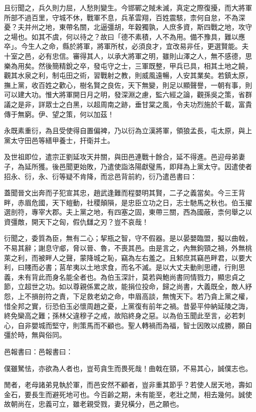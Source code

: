 \begin{pinyinscope}
且衍聞之，兵久則力屈，人愁則變生。今邯鄲之賊未滅，真定之際復擾，而大將軍所部不過百里，守城不休，戰軍不息，兵革雲翔，百姓震駭，柰何自怠，不為深憂？夫并州之地，東帶名關，北逼彊胡，年穀獨孰，人庶多資，斯四戰之地，攻守之場也。如其不虞，何以待之？故曰「德不素積，人不為用。備不豫具，難以應卒」。今生人之命，縣於將軍，將軍所杖，必須良才，宜改易非任，更選賢能。夫十室之邑，必有忠信。審得其人，以承大將軍之明，雖則山澤之人，無不感德，思樂為用矣。然後簡精銳之卒，發屯守之士，三軍既整，甲兵已具，相其土地之饒，觀其水泉之利，制屯田之術，習戰射之教，則威風遠暢，人安其業矣。若鎮太原，撫上黨，收百姓之歡心，樹名賢之良佐，天下無變，則足以顯聲譽，一朝有事，則可以建大功。惟大將軍開日月之明，發深淵之慮，監六經之論，觀孫吳之策，省群議之是非，詳眾士之白黑，以超周南之跡，垂甘棠之風，令夫功烈施於千載，富貴傳于無窮。伊、望之策，何以加茲！

永既素重衍，為且受使得自置偏裨，乃以衍為立漢將軍，領狼孟長，屯太原，與上黨太守田邑等繕甲養士，扞衛并土。

及世祖即位，遣宗正劉延攻天井關，與田邑連戰十餘合，延不得進。邑迎母弟妻子，為延所獲。後邑聞更始敗，乃遣使詣洛陽獻璧馬，即拜為上黨太守。因遣使者招永、衍，永、衍等疑不肯降，而忿邑背前約，衍乃遣邑書曰：

蓋聞晉文出奔而子犯宣其忠，趙武逢難而程嬰明其賢，二子之義當矣。今三王背畔，赤眉危國，天下螘動，社稷顛隕，是忠臣立功之日，志士馳馬之秋也。伯玉擢選剖符，專宰大郡。夫上黨之地，有四塞之固，東帶三關，西為國蔽，柰何舉之以資彊敵，開天下之匈，假仇讎之刃？豈不哀哉！

衍聞之，委質為臣，無有二心；挈瓶之智，守不假器。是以晏嬰臨盟，擬以曲戟，不易其辭；謝息守郕，脅以晉、魯，不喪其邑。由是言之，內無鉤頸之禍，外無桃萊之利，而被畔人之聲，蒙降城之恥，竊為左右羞之。且邾庶其竊邑畔君，以要大利，曰賤而必書；莒牟夷以土地求食，而名不滅。是以大丈夫動則思禮，行則思義，未有背此而身名能全者也。為伯玉深計，莫若與鮑尚書同情戮力，顯忠貞之節，立超世之功。如以尊親係累之故，能捐位投命，歸之尚書，大義既全，敵人紓怨，上不損剖符之責，下足救老幼之命，申眉高談，無愧天下。若乃貪上黨之權，惜全邦之實，衍恐伯玉必懷周趙之憂，上黨復有前年之禍。昔晏平仲納延陵之誨，終免欒高之難；孫林父違穆子之戒，故陷終身之惡。以為伯玉聞此至言，必若刺心，自非嬰城而堅守，則策馬而不顧也。聖人轉禍而為福，智士因敗以成勝，願自彊於時，無與俗同。

邑報書曰：邑報書曰：

僕雖駑怯，亦欲為人者也，豈苟貪生而畏死哉！曲戟在頸，不易其心，誠僕志也。

閒者，老母諸弟見執於軍，而邑安然不顧者，豈非重其節乎？若使人居天地，壽如金石，要長生而避死地可也。今百齡之期，未有能至，老壯之閒，相去幾何。誠使故朝尚在，忠義可立，雖老親受戮，妻兒橫分，邑之願也。


\end{pinyinscope}
